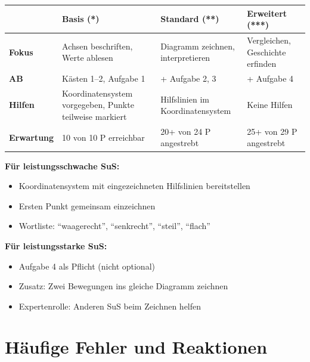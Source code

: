 \documentclass[11pt,a4paper]{article}
\begin{document}
\begin{tabular}{|l|p{4cm}|p{4cm}|p{4cm}|}
\hline
& \textbf{Basis (*)} & \textbf{Standard (**)} & \textbf{Erweitert (***)} \\
\hline
\textbf{Fokus} & Achsen beschriften, Werte ablesen & Diagramm zeichnen, interpretieren & Vergleichen, Geschichte erfinden \\
\hline
\textbf{AB} & Kästen 1--2, Aufgabe 1 & + Aufgabe 2, 3 & + Aufgabe 4 \\
\hline
\textbf{Hilfen} & Koordinatensystem vorgegeben, Punkte teilweise markiert & Hilfslinien im Koordinatensystem & Keine Hilfen \\
\hline
\textbf{Erwartung} & 10 von 10 P erreichbar & 20+ von 24 P angestrebt & 25+ von 29 P angestrebt \\
\hline
\end{tabular}

\vspace{1em}

\begin{tippbox}
\textbf{Für leistungsschwache SuS:}
\begin{itemize}[leftmargin=1.5em]
    \item Koordinatensystem mit eingezeichneten Hilfslinien bereitstellen
    \item Ersten Punkt gemeinsam einzeichnen
    \item Wortliste: ``waagerecht'', ``senkrecht'', ``steil'', ``flach''
\end{itemize}
\end{tippbox}

\begin{tippbox}
\textbf{Für leistungsstarke SuS:}
\begin{itemize}[leftmargin=1.5em]
    \item Aufgabe 4 als Pflicht (nicht optional)
    \item Zusatz: Zwei Bewegungen ins gleiche Diagramm zeichnen
    \item Expertenrolle: Anderen SuS beim Zeichnen helfen
\end{itemize}
\end{tippbox}

\section*{Häufige Fehler und Reaktionen}
\end{document}
